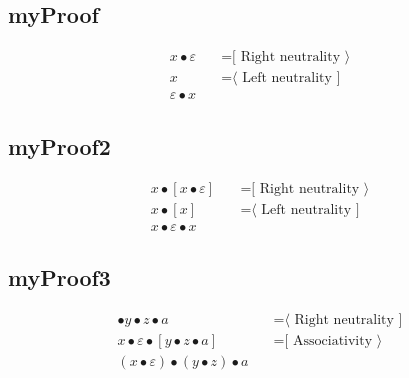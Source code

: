 \documentclass{article}
\begin{document}
\subsection{myProof}
\begin{align*}
x • ε
  & \quad \text{=[ Right neutrality ⟩}\\
x
  & \quad \text{=⟨ Left neutrality ]}\\
ε • x
\end{align*}
\subsection{myProof2}
\begin{align*}
x • [x • ε]
  & \quad \text{=[ Right neutrality ⟩}\\
x • [x]
  & \quad \text{=⟨ Left neutrality ]}\\
x • ε • x
\end{align*}
\subsection{myProof3}
\begin{align*}
[x] • y • z • a
  & \quad \text{=⟨ Right neutrality ]}\\
x • ε • [y • z • a]
  & \quad \text{=[ Associativity ⟩}\\
(x • ε) • (y • z) • a
\end{align*}
\end{document}
